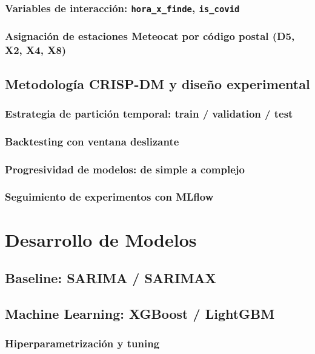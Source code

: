 \documentclass[12pt, a4paper]{article}
\begin{document}
\subsubsection{Variables de interacción: \texttt{hora\_x\_finde}, \texttt{is\_covid}}
\subsubsection{Asignación de estaciones Meteocat por código postal (D5, X2, X4, X8)}

\subsection{Metodología CRISP-DM y diseño experimental}
\subsubsection{Estrategia de partición temporal: train / validation / test}
\subsubsection{Backtesting con ventana deslizante}
\subsubsection{Progresividad de modelos: de simple a complejo}
\subsubsection{Seguimiento de experimentos con MLflow}

\section{Desarrollo de Modelos}

\subsection{Baseline: SARIMA / SARIMAX}
\subsection{Machine Learning: XGBoost / LightGBM}
\subsubsection{Hiperparametrización y tuning}
\end{document}
